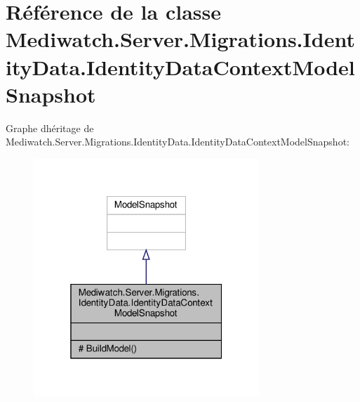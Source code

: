 \hypertarget{class_mediwatch_1_1_server_1_1_migrations_1_1_identity_data_1_1_identity_data_context_model_snapshot}{}\section{Référence de la classe Mediwatch.\+Server.\+Migrations.\+Identity\+Data.\+Identity\+Data\+Context\+Model\+Snapshot}
\label{class_mediwatch_1_1_server_1_1_migrations_1_1_identity_data_1_1_identity_data_context_model_snapshot}


Graphe d\textquotesingle{}héritage de Mediwatch.\+Server.\+Migrations.\+Identity\+Data.\+Identity\+Data\+Context\+Model\+Snapshot\+:\nopagebreak
\begin{figure}[H]
\begin{center}
\leavevmode
\includegraphics[width=241pt]{class_mediwatch_1_1_server_1_1_migrations_1_1_identity_data_1_1_identity_data_context_model_snapshot__inherit__graph}
\end{center}
\end{figure}


